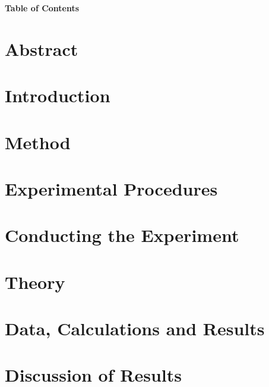 \documentclass{article}
\begin{document}
	\normalsize
	\newpage{}
	\noindent\vspace{0em}
	\begin{center}
		\LARGE \textbf{Table of Contents}\\[-7em]
	\end{center}
	{
		\hypersetup{linkcolor=black}
		\tableofcontents
	}    
	
	
	\large\newpage\restoregeometry\vspace*{-20pt}
	
	\section{Abstract}
	\vspace*{1em}
	
	
	\newpage\vspace*{-20pt}
	\section{Introduction}
	
	
	\newpage\vspace*{-20pt}
	\section{Method}
	
	\newpage
	
	\section{Experimental Procedures}
	
	\newpage
	\section{Conducting the Experiment}
	
	\newpage
	\section{Theory}
	
	\newpage	
	\section{Data, Calculations and Results}
	
	\newpage
	\section{Discussion of Results}
	
\end{document}
